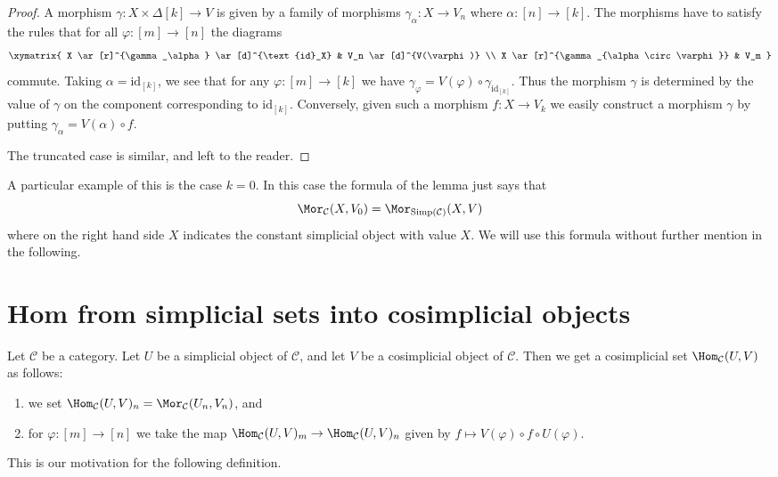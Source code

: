 \begin{proof}
A morphism $\gamma : X \times \Delta[k] \to V$ is given by
a family of morphisms $\gamma_\alpha : X \to V_n$ where
$\alpha : [n] \to [k]$. The morphisms have to satisfy the
rules that for all $\varphi : [m] \to [n]$ the diagrams
$$
\xymatrix{
X \ar[r]^{\gamma_\alpha} \ar[d]^{\text{id}_X} & V_n \ar[d]^{V(\varphi)} \\
X \ar[r]^{\gamma_{\alpha \circ \varphi}} & V_m
}
$$
commute. Taking $\alpha = \text{id}_{[k]}$, we see that
for any $\varphi : [m] \to [k]$ we have $\gamma_\varphi =
V(\varphi) \circ \gamma_{\text{id}_{[k]}}$. Thus the morphism
$\gamma$ is determined by the value of $\gamma$ on the
component corresponding to $\text{id}_{[k]}$. Conversely,
given such a morphism $f : X \to V_k$ we easily
construct a morphism $\gamma$ by putting
$\gamma_\alpha = V(\alpha) \circ f$.

\medskip\noindent
The truncated case is similar, and left to the reader.
\end{proof}

\noindent
A particular example of this is the case $k = 0$.
In this case the formula of the lemma just says
that
$$
\Mor_\mathcal{C}(X, V_0)
=
\Mor_{\text{Simp}(\mathcal{C})}(X, V)
$$
where on the right hand side $X$ indicates the
constant simplicial object with value $X$. We will
use this formula without further mention in the
following.




\section{Hom from simplicial sets into cosimplicial objects}
\label{section-hom-from-simplicial-sets-into-cosimplicial}

\noindent
Let $\mathcal{C}$ be a category.
Let $U$ be a simplicial object of $\mathcal{C}$,
and let $V$ be a cosimplicial object of $\mathcal{C}$.
Then we get a cosimplicial set $\Hom_\mathcal{C}(U, V)$
as follows:
\begin{enumerate}
\item we set
$\Hom_\mathcal{C}(U, V)_n = \Mor_\mathcal{C}(U_n, V_n)$, and
\item for $\varphi : [m] \to [n]$ we take the map
$\Hom_\mathcal{C}(U, V)_m \to \Hom_\mathcal{C}(U, V)_n$
given by $f \mapsto V(\varphi) \circ f \circ U(\varphi)$.
\end{enumerate}
This is our motivation for the following definition.

